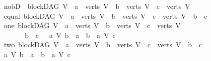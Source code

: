 \begin{isabellebody}
\ \ \ {\isacharparenleft}{\kern0pt}no{\isacharunderscore}{\kern0pt}bD{\isacharparenright}{\kern0pt}\ {\isachardoublequoteopen}{\isacharparenleft}{\kern0pt}{\isasymnot}\ blockDAG\ V\ {\isasymor}\ a\ {\isasymnotin}\ verts\ V\ {\isasymor}\ b\ {\isasymnotin}\ verts\ V\ {\isasymor}\ c\ {\isasymnotin}\ verts\ V{\isacharparenright}{\kern0pt}{\isachardoublequoteclose}\isanewline
\ \ {\isacharbar}{\kern0pt}\ {\isacharparenleft}{\kern0pt}equal{\isacharparenright}{\kern0pt}\ {\isachardoublequoteopen}{\isacharparenleft}{\kern0pt}blockDAG\ V\ {\isasymand}\ a\ {\isasymin}\ verts\ V\ {\isasymand}\ b\ {\isasymin}\ verts\ V\ {\isasymand}\ c\ {\isasymin}\ verts\ V{\isacharparenright}{\kern0pt}\ {\isasymand}\ b\ {\isacharequal}{\kern0pt}\ c{\isachardoublequoteclose}\ \isanewline
\ \ {\isacharbar}{\kern0pt}\ {\isacharparenleft}{\kern0pt}one{\isacharparenright}{\kern0pt}\ {\isachardoublequoteopen}{\isacharparenleft}{\kern0pt}blockDAG\ V\ {\isasymand}\ a\ {\isasymin}\ verts\ V\ {\isasymand}\ b\ {\isasymin}\ verts\ V\ {\isasymand}\ c\ {\isasymin}\ verts\ V{\isacharparenright}{\kern0pt}\ {\isasymand}\isanewline
\ \ \ \ \ \ \ \ \ b\ {\isasymnoteq}\ c\ \ {\isasymand}\ {\isacharparenleft}{\kern0pt}{\isacharparenleft}{\kern0pt}{\isacharparenleft}{\kern0pt}a\ {\isasymrightarrow}\isactrlsup {\isacharplus}{\kern0pt}\isactrlbsub V\isactrlesub \ b{\isacharparenright}{\kern0pt}\ {\isasymor}\ a\ {\isacharequal}{\kern0pt}\ b{\isacharparenright}{\kern0pt}\ {\isasymand}\ {\isasymnot}{\isacharparenleft}{\kern0pt}a\ {\isasymrightarrow}\isactrlsup {\isacharplus}{\kern0pt}\isactrlbsub V\isactrlesub \ c{\isacharparenright}{\kern0pt}{\isacharparenright}{\kern0pt}{\isachardoublequoteclose}\ \isanewline
\ \ {\isacharbar}{\kern0pt}\ {\isacharparenleft}{\kern0pt}two{\isacharparenright}{\kern0pt}\ {\isachardoublequoteopen}{\isacharparenleft}{\kern0pt}blockDAG\ V\ {\isasymand}\ a\ {\isasymin}\ verts\ V\ {\isasymand}\ b\ {\isasymin}\ verts\ V\ {\isasymand}\ c\ {\isasymin}\ verts\ V{\isacharparenright}{\kern0pt}\ {\isasymand}\ b\ {\isasymnoteq}\ c\ \isanewline
\ \ {\isasymand}\ {\isasymnot}{\isacharparenleft}{\kern0pt}{\isacharparenleft}{\kern0pt}{\isacharparenleft}{\kern0pt}a\ {\isasymrightarrow}\isactrlsup {\isacharplus}{\kern0pt}\isactrlbsub V\isactrlesub \ b{\isacharparenright}{\kern0pt}\ {\isasymor}\ a\ {\isacharequal}{\kern0pt}\ b{\isacharparenright}{\kern0pt}\ {\isasymand}\ {\isasymnot}{\isacharparenleft}{\kern0pt}a\ {\isasymrightarrow}\isactrlsup {\isacharplus}{\kern0pt}\isactrlbsub V\isactrlesub \ c{\isacharparenright}{\kern0pt}{\isacharparenright}{\kern0pt}\ {\isasymand}\ \isanewline

\end{isabellebody}
